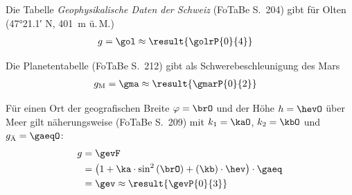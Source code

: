 \begin{abcliste}
\abc Die Tabelle \emph{Geophysikalische Daten der Schweiz} (FoTaBe S.~204) gibt für Olten (\ang{47;21.1;} N, \SI{401}{\meter} ü.\,M.)
\begin{align}
 g &= \gol \approx \result{\golrP{0}{4}}
\end{align}

\abc Die Planetentabelle (FoTaBe S.~212) gibt als Schwerebeschleunigung des Mars
\begin{align}
 g_\mathrm{M} &= \gma \approx \result{\gmarP{0}{2}}
\end{align}

\abc Für einen Ort der geografischen Breite $\varphi = \brO$ und der Höhe $h = \hevO$ über Meer gilt näherungsweise (FoTaBe S.~209) mit $k_1 = \kaO$, $k_2 = \kbO$ und $g_\text{Ä} = \gaeqO$:
\begin{align}
 g &= \gevF \\
   &= \left(1+\ka\cdot\sin^2\left(\brO\right)+\left(\kb\right)\cdot\hev\right)\cdot\gaeq \\
   &= \gev \approx \result{\gevP{0}{3}}
\end{align}
\end{abcliste}
